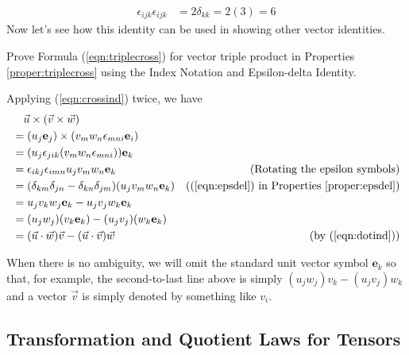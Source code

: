 \begin{align}
\epsilon_{ijk}\epsilon_{ijk} &= 2\delta_{kk} = 2(3) = 6
\end{align}
Now let's see how this identity can be used in showing other vector identities.
\begin{exmp}
Prove Formula (\ref{eqn:triplecross}) for vector triple product in Properties \ref{proper:triplecross} using the Index Notation and Epsilon-delta Identity.
\end{exmp}
\begin{solution}
Applying (\ref{eqn:crossind}) twice, we have
\begin{align*}
&\quad \vec{u} \times (\vec{v} \times \vec{w}) \\
&= (u_j\textbf{e}_j) \times (v_mw_n\epsilon_{mni}\textbf{e}_i) \\
&= (u_j\epsilon_{jik}(v_mw_n\epsilon_{mni})) \textbf{e}_k \\
&= \epsilon_{ikj}\epsilon_{imn}u_jv_mw_n \textbf{e}_k &\text{(Rotating the epsilon symbols)} \\
&= (\delta_{km}\delta_{jn} - \delta_{kn}\delta_{jm})(u_jv_mw_n \textbf{e}_k) & \text{((\ref{eqn:epsdel}) in Properties \ref{proper:epsdel})} \\
&= u_jv_kw_j \textbf{e}_k - u_jv_jw_k \textbf{e}_k \\
&= (u_jw_j)(v_k\textbf{e}_k) - (u_jv_j)(w_k \textbf{e}_k) \\
&= (\vec{u} \cdot \vec{w})\vec{v} - (\vec{u} \cdot \vec{v})\vec{w} & \text{(by (\ref{eqn:dotind}))}
\end{align*}
\end{solution}
When there is no ambiguity, we will omit the standard unit vector symbol $\textbf{e}_k$ so that, for example, the second-to-last line above is simply $(u_jw_j)v_k - (u_jv_j)w_k$ and a vector $\vec{v}$ is simply denoted by something like $v_i$.

\subsection{Transformation and Quotient Laws for Tensors}

